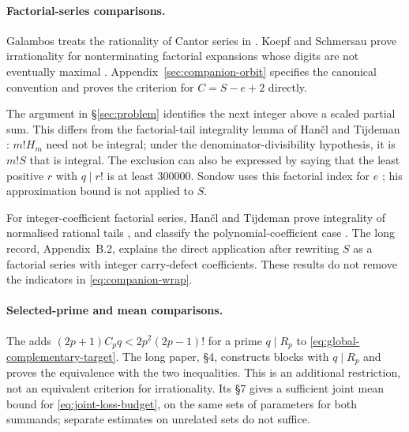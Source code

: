 \documentclass[11pt]{article}
\begin{document}
\paragraph{Factorial-series comparisons.}
Galambos treats the rationality of Cantor series in
\cite[Ch.~II, \S2.1, pp.~21--22]{galambos1976}. Koepf and Schmersau prove
irrationality for nonterminating factorial expansions whose digits are not
eventually maximal \cite[Example~3.2, p.~121]{koepf-schmersau}.
Appendix~\ref{sec:companion-orbit} specifies the canonical convention and
proves the criterion for $C=S-e+2$ directly.

The argument in \S\ref{sec:problem} identifies the next integer above a
scaled partial sum. This differs from the factorial-tail integrality lemma
of Han\v{c}l and Tijdeman
\cite[Lemma~2.1 and the following remark, p.~385]{hancl-tijdeman}:
$m!H_m$ need not be integral; under the denominator-divisibility hypothesis,
it is $m!S$ that is integral. The exclusion can also be expressed by saying
that the least positive $r$ with $q\mid r!$ is at least $300000$.
Sondow uses this factorial index for $e$
\cite[\S3, Theorem~1]{sondow2006}; his approximation bound is not applied to $S$.

For integer-coefficient factorial series, Han\v{c}l and Tijdeman prove
integrality of normalised rational tails
\cite[Lemma~2.1 and the following remark, p.~385]{hancl-tijdeman}, and
classify the polynomial-coefficient case
\cite[Theorem~3.1 and Corollary~3.1, pp.~390--391]{hancl-tijdeman}.
The long record, Appendix~B.2, explains the direct application after
rewriting $S$ as a factorial series with integer carry-defect coefficients.
These results do not remove the indicators in \eqref{eq:companion-wrap}.

\paragraph{Selected-prime and mean comparisons.}
The
adds $(2p+1)C_pq<2p^2(2p-1)!$ for a prime $q\mid R_p$ to
\eqref{eq:global-complementary-target}. The long paper, \S4, constructs
blocks with $q\mid R_p$ and proves the equivalence with the two inequalities.
This is an additional restriction, not an equivalent criterion for
irrationality. Its \S7 gives a sufficient joint mean bound for
\eqref{eq:joint-loss-budget}, on the same sets of parameters for both
summands; separate estimates on unrelated sets do not suffice.
\end{document}
